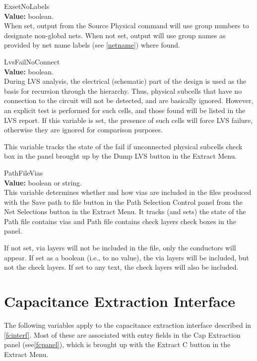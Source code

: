 \begin{description}
\item{\et ExsetNoLabels}\\
{\bf Value:} boolean.\\
When set, output from the {\cb Source Physical} command will use group
numbers to designate non-global nets.  When not set, output will use
group names as provided by net name labels (see \ref{netname}) where
found.

\item{\et LvsFailNoConnect}\\
{\bf Value:} boolean.\\
During LVS analysis, the electrical (schematic) part of the design is
used as the basis for recursion through the hierarchy.  Thus, physical
subcells that have no connection to the circuit will not be detected,
and are basically ignored.  However, an explicit test is performed for
such cells, and those found will be listed in the LVS report.  If this
variable is set, the presence of such cells will force LVS failure,
otherwise they are ignored for comparison purposes.

This variable tracks the state of the {\cb fail if unconnected
physical subcells} check box in the panel brought up by the {\cb Dump
LVS} button in the {\cb Extract Menu}.

\item{\et PathFileVias}\\
{\bf Value:} boolean or string.\\
This variable determines whether and how vias are included in the
files produced with the {\cb Save path to file} button in the {\cb
Path Selection Control} panel from the {\cb Net Selections} button in
the {\cb Extract Menu}.  It tracks (and sets) the state of the {\cb
Path file contains vias} and {\cb Path file contains check layers}
check boxes in the panel.

If not set, via layers will not be included in the file, only the
conductors will appear.  If set as a boolean (i.e., to no value), the
via layers will be included, but not the check layers.  If set to any
text, the check layers will also be included.
\end{description}

\section{Capacitance Extraction Interface}
\label{fcvars}
The following variables apply to the capacitance extraction interface
described in \ref{fcinterf}.  Most of these are associated with entry
fields in the {\cb Cap Extraction} panel (see\ref{fcpanel}), which is
brought up with the {\cb Extract C} button in the {\cb Extract Menu}.

